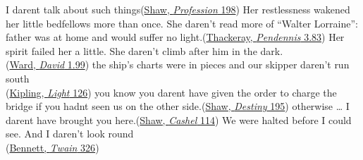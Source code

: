 \ea \label{ex:11-96}
I darent talk about such things\hfill(\href{https://archive.org/details/mrswarrensprofes00shawuoft/page/198/mode/2up?q=%22talk+about+such+things%22&view=theater}{Shaw, \textit{Profession} 198})
\ex \label{ex:11-97}
\ea
Her restlessness wakened her little bedfellows more than once. She daren't read more of ``Walter Lorraine'': father was at home and would suffer no light.\hfill(\href{https://archive.org/details/dli.ministry.14127/page/493/mode/2up?q=%22restlessness+wakened%22&view=theater}{Thackeray, \textit{Pendennis} 3.83}) %
\ex
Her spirit failed her a little. She daren't climb after him in the dark.\\\hfill(\href{https://archive.org/details/historydavidgri02wardgoog/page/56/mode/2up?q=%22her+spirit+failed+her%22&view=theater}{Ward, \textit{David} 1.99})
\ex
the ship's charts were in pieces and our skipper daren't run south\\\hfill(\href{https://archive.org/details/lightthatfailed0000rudy_q6g8/page/132/mode/2up?q=%22charts+were+in+pieces%22&view=theater}{Kipling, \textit{Light} 126}) %
\ex
you know you darent have given the order to charge the bridge if you hadnt seen us on the other side.\hfill(\href{https://archive.org/details/manofdestinytri00shaw/page/194/mode/2up?q=%22have+given+the+order%22&view=theater}{Shaw, \textit{Destiny} 195}) %
\ex
otherwise {\dots} I darent have brought you here.\hfill(\href{https://archive.org/details/cashelbyronsprof00shawuoft/page/n141/mode/2up?q=%22darent+have%22&view=theater}{Shaw, \textit{Cashel} 114})
\ex
We were halted before I could see. And I daren't look round\\\hfill(\href{https://archive.org/details/thesetwain0000arno_p9h0/page/330/mode/2up?q=%22halted+before%22&view=theater}{Bennett, \textit{Twain} 326})
\z
\z


